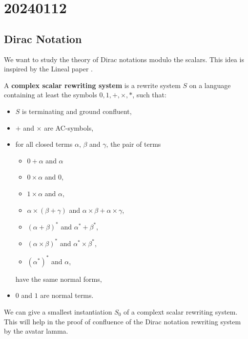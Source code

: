\chapter{20240112}

\renewcommand*{\unit}{\texttt{unit}}
\renewcommand*{\utt}{\texttt{tt}}
\renewcommand*{\fst}{\texttt{fst}}
\renewcommand*{\snd}{\texttt{snd}}
\renewcommand*{\reduce}{\ \triangleright\ }

\section{Dirac Notation}

We want to study the theory of Dirac notations modulo the scalars. This idea is inspired by the Lineal paper \cite{Arrighi2017}.

\begin{definition}
  A \textbf{complex scalar rewriting system} is a rewrite system $S$ on a language containing at least the symbols $0, 1, +, \times, *$, such that:
  \begin{itemize}
    \item $S$ is terminating and ground confluent,
    \item $+$ and $\times$ are AC-symbols,
    \item for all closed terms $\alpha$, $\beta$ and $\gamma$, the pair of terms
      \begin{itemize}
        \item $0 + \alpha$ and $\alpha$
        \item $0 \times \alpha$ and $0$,
        \item $1 \times \alpha$ and $\alpha$,
        \item $\alpha \times (\beta + \gamma)$ and $\alpha \times \beta + \alpha \times \gamma$,
        \item $(\alpha + \beta)^*$ and $\alpha^* + \beta^*$,
        \item $(\alpha \times \beta)^*$ and $\alpha^* \times \beta^*$,
        \item $(\alpha^*)^*$ and $\alpha$,
      \end{itemize}
      have the same normal forms,
    \item $0$ and $1$ are normal terms.
  \end{itemize}
\end{definition}

We can give a smallest instantiation $S_0$ of a complext scalar rewriting system. This will help in the proof of confluence of the Dirac notation rewriting system by the avatar lamma.

